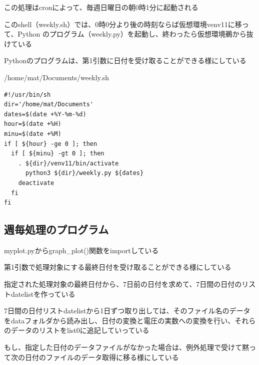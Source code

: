 \documentclass[12pt,a4paper,uplatex]{jsbook}
\begin{document}
この処理はcronによって、毎週日曜日の朝0時1分に起動される

このshell（weekly.sh）では、0時0分より後の時刻ならば仮想環境venv11に移って、Python のプログラム（weekly.py）を起動し、終わったら仮想環境鵜から抜けている

Pythonのプログラムは、第1引数に日付を受け取ることができる様にしている

\begin{itembox}[l]{/home/mat/Documents/weekly.sh}
	\begin{verbatim}
#!/usr/bin/sh
dir='/home/mat/Documents'
dates=$(date +%Y-%m-%d)
hour=$(date +%H)
minu=$(date +%M)
if [ ${hour} -ge 0 ]; then
  if [ ${minu} -gt 0 ]; then
    . ${dir}/venv11/bin/activate
      python3 ${dir}/weekly.py ${dates}
    deactivate
  fi
fi
	\end{verbatim}
\end{itembox}

\subsection{週毎処理のプログラム}

	myplot.pyからgraph\_plot()関数をimportしている
	
	第1引数で処理対象にする最終日付を受け取ることができる様にしている
	
	指定された処理対象の最終日付から、7日前の日付を求めて、7日間の日付のリストdatelistを作っている
	
	7日間の日付リストdatelistから1日ずつ取り出しては、そのファイル名のデータをdataフォルダから読み出し、日付の変換と電圧の実数への変換を行い、それらのデータのリストをlist0に追記していっている
	
	もし、指定した日付のデータファイルがなかった場合は、例外処理で受けて黙って次の日付のファイルのデータ取得に移る様にしている
	
\end{document}
